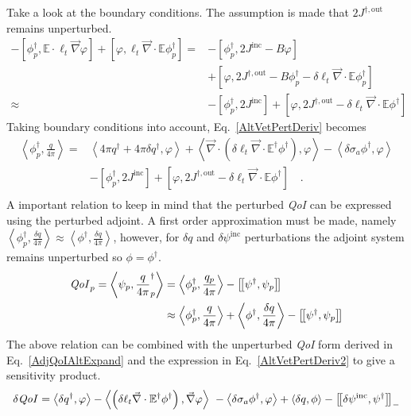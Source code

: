 \documentclass[12pt]{report}
\newcommand{\bra}{\left\langle}
\newcommand{\ket}{\right\rangle}
\newcommand{\sbraSN}{\left[ \! \left[}
\newcommand{\sketSN}{\right] \! \right]}
\newcommand{\sbra}{\left[}
\newcommand{\sket}{\right]}
\renewcommand{\div}{\vec{\nabla} \cdot}
\newcommand{\grad}{\vec{\nabla}}
\newcommand{\Edd}{\mathbb{E}}
\newcommand{\siga}{\sigma_a}
\newcommand{\isigt}{\ell_t}
\newcommand{\angSource}{\frac{q}{4 \pi}}
\newcommand{\angSourcep}{\frac{q_p}{4 \pi}}
\newcommand{\angSourced}{\frac{\delta q}{4 \pi}}
\newcommand{\scalResp}{q^\dag}
\newcommand{\qoi}{{\it QoI}\xspace}
\begin{document}
Take a look at the boundary conditions. The assumption is made that $2 J^{\dag,\text{out}}$ remains unperturbed.
\begin{equation}
\begin{split}
 - \sbra \phi^\dag_p, \Edd \cdot \isigt \grad \varphi \sket  + \sbra \varphi, \isigt \div \Edd \phi_p^\dag \sket 
=&- \sbra \phi_p^\dag, 2J^{\text{inc}} - B \varphi \sket \\ 
&+ \sbra \varphi, 2 J^{\dag,\text{out}} - B \phi_p^\dag - \delta \isigt \div \Edd \phi_p^\dag \sket \\
\approx&- \sbra \phi_p^\dag, 2J^{\text{inc}} \sket + \sbra \varphi , 2 J^{\dag,\text{out}} - \delta \isigt \div \Edd \phi^\dag \sket 
\end{split}
\end{equation}
Taking boundary conditions into account, Eq.~\eqref{AltVetPertDeriv} becomes
\begin{equation}
\label{AltVetPertDeriv2}
\begin{split}
 \bra  \phi^\dag_p , \angSource \ket  =& \bra 4 \pi \scalResp + 4 \pi\delta \scalResp , \varphi \ket + \bra\div \left( \delta \isigt \div \Edd^\dag \phi^\dag  \right), \varphi \ket 
- \bra \delta \siga \phi^\dag , \varphi \ket \\
&- \sbra \phi_p^\dag, 2J^{\text{inc}} \sket + \sbra \varphi , 2 J^{\dag,\text{out}} - \delta \isigt \div \Edd \phi^\dag \sket  \quad . \\
\end{split}
\end{equation} 
A important relation to keep in mind that the perturbed \qoi can be expressed using the perturbed adjoint. A first order approximation must be made, namely $\bra \phi^\dag_p ,  \angSourced \ket \approx \bra \phi^\dag , \angSourced \ket$, however, for $\delta q$ and $\delta \psi^{\text{inc}}$ perturbations the adjoint system remains unperturbed so $\phi=\phi^\dag$.
\begin{equation}
\begin{split}
\qoi_p  = \bra \psi_p , \angSource_p^\dag \ket &= \bra \phi^\dag_p , \angSourcep \ket - \sbraSN \psi^\dag,  \psi_p \sketSN \\
&\approx \bra \phi^\dag_p , \angSource \ket + \bra \phi^\dag , \angSourced \ket - \sbraSN \psi^\dag,  \psi_p \sketSN \\
\end{split} 
\end{equation}
The above relation can be combined with the unperturbed \qoi form derived in Eq.~\eqref{AdjQoIAltExpand} and the expression in  Eq.~\eqref{AltVetPertDeriv2} to give a sensitivity product. 
\begin{equation}
\label{AltVETsens}
\delta \qoi = \bra \delta q^\dag, \varphi \ket - \bra\left( \delta \isigt \div \Edd^\dag \phi^\dag  \right), \grad \varphi \ket \
- \bra \delta \siga \phi^\dag , \varphi \ket + \bra \delta q , \phi \ket - \sbraSN \delta \psi^{\text{inc}}, \psi^\dag \sketSN_-
\end{equation}
\end{document}
